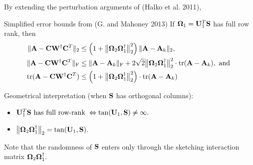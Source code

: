 \documentclass[xcolor=x11names,compress,ignorenonframetext,10pt]{beamer}
\renewcommand{\(}{\begin{columns}}
\renewcommand{\)}{\end{columns}}
\newcommand{\<}[1]{\begin{column}{#1}}
\renewcommand{\>}{\end{column}}
\def\refcolor{DodgerBlue4}
\newcommand{\refer}[1]{({\color{\refcolor}#1})}
\begin{document}
\begin{frame} 
 By extending the perturbation arguments of \refer{Halko et al. 2011}, 
 
 \begin{block}{Simplified error bounds from \refer{G. and Mahoney 2013}}
 If $\boldsymbol{\Omega}_1 = \mathbf{U}_1^T \mathbf{S}$ has full row rank, then
 \begin{align*}
 \|\mathbf{A} - \mathbf{C} \mathbf{W}^\dagger \mathbf{C}^T\|_2 & \leq \left(1 + \big\|\boldsymbol{\Omega}_2 \boldsymbol{\Omega}_1^\dagger\big\|_2^2\right) \|\mathbf{A} - \mathbf{A}_k\|_2 , \\
 \|\mathbf{A} - \mathbf{C} \mathbf{W}^\dagger \mathbf{C}^T\|_{\mathrm{F}} & \leq \|\mathbf{A} - \mathbf{A}_k\|_{\mathrm{F}} + 2\sqrt{2} 
 \big\| {\boldsymbol{\Omega}_2 \boldsymbol{\Omega}_1^\dagger} \big\|_2^2 \cdot \operatorname{tr}(\mathbf{A} - \mathbf{A}_k), \text{ and } \\
 \operatorname{tr}(\mathbf{A} - \mathbf{C} \mathbf{W}^\dagger \mathbf{C}^T) & \leq 
  \left(1+ \big\| { \boldsymbol{\Omega}_2 \boldsymbol{\Omega}_1^\dagger} \big\|_2^2 \right) \cdot \operatorname{tr}(\mathbf{A} - \mathbf{A}_k)
 \end{align*}
 \end{block}
 
 Geometrical interpretation (when $\mathbf{S}$ has orthogonal columns):
 \begin{itemize}
  \item $\mathbf{U}_1^T \mathbf{S} \text{ has full row-rank } \Leftrightarrow \tan(\mathbf{U}_1, \mathbf{S}) \neq \infty.$ 
  \item $\big\|\boldsymbol{\Omega}_2 \boldsymbol{\Omega}_1^\dagger\big\|_2 = \tan(\mathbf{U}_1, \mathbf{S}).$
 \end{itemize}
 Note that the randomness of $\mathbf{S}$ enters only through the sketching interaction matrix  ${\boldsymbol{\Omega}_2 \boldsymbol{\Omega}_1^\dagger}.$
\end{frame}

%  
% 
% 
% 
%   
\end{document}
